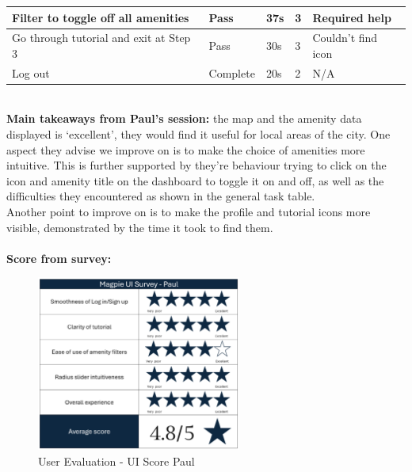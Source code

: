 \begin{table}[h!]
\begin{tabular}{|p{}|p{}|p{}|p{}|p{}|}
        \hline
        Filter to toggle off all amenities            & Pass            & 37s                 & 3                   & Required help      \\
        \hline
        Go through tutorial and exit at Step 3        & Pass            & 30s                 & 3                   & Couldn't find icon \\
        \hline
        Log out                                       & Complete        & 20s                 & 2                   & N/A                \\
        \hline
    \end{tabular}
\end{table}\\
\textbf{Main takeaways from Paul's session: }the map and the amenity data displayed is `excellent', they would find it useful for local areas of the city. One aspect they advise we improve on is to make the choice of amenities more intuitive. This is further supported by they're behaviour trying to click on the icon and amenity title on the dashboard to toggle it on and off, as well as the difficulties they encountered as shown in the general task table.\\
Another point to improve on is to make the profile and tutorial icons more visible, demonstrated by the time it took to find them.\\ \\
\noindent\textbf{Score from survey: }
\begin{figure}[h!]
    \centering
    \includegraphics[width=0.6\textwidth]{images/survey-paul.png}
    \caption{User Evaluation - UI Score Paul}
\end{figure}

\newpage
